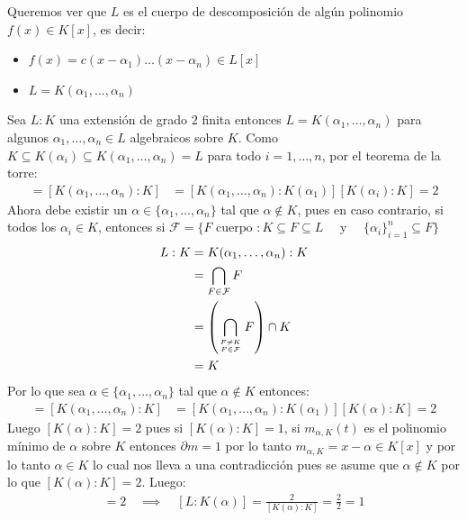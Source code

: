 \begin{solucion}
Queremos ver que $L$ es el cuerpo de descomposición de algún polinomio $f(x) \in K[x]$, es decir:
\begin{itemize}
    \item $f(x) = c(x-\alpha_1)\dots(x-\alpha_n) \in L[x]$ 
    \item $L = K(\alpha_1,\dots,\alpha_n)$
\end{itemize}
Sea $L:K$ una extensión de grado $2$ finita entonces $L = K(\alpha_1, \dots, \alpha_n)$ para algunos $\alpha_1, \dots, \alpha_n \in L$ algebraicos sobre $K$. Como $K\subseteq K(\alpha_i)\subseteq K(\alpha_1,\dots,\alpha_n) = L$ para todo $i =1,\dots,n$, por el teorema de la torre:
\begin{align*}
[L:K]= [K(\alpha_1,\dots,\alpha_n):K] &= [K(\alpha_1,\dots,\alpha_n):K(\alpha_1)][K(\alpha_i):K]=2
\end{align*}
Ahora debe existir un $\alpha \in \{\alpha_1, \dots, \alpha_n\}$ tal que $\alpha \notin K$, pues en caso contrario, si todos los $\alpha_i \in K$, entonces si $\mathcal F = \{F \text{ cuerpo }: K \subseteq F \subseteq L\quad \text{   y   } \quad \{\alpha_i\}_{i=1}^n \subseteq F\}$
\begin{align*}
    L:K &= K(\alpha_1, \dots, \alpha_n):K \\
    &=\bigcap_{F\in \mathcal F} F\\
    &= \left(\bigcap_{F\neq K \atop F\in \mathcal F } F \right) \cap K\\
    &= K
\end{align*}
Por lo que sea $\alpha \in \{\alpha_1, \dots,\alpha_n\}$ tal que $\alpha \notin K$ entonces:
\begin{align*}
[L:K]= [K(\alpha_1,\dots,\alpha_n):K] &= [K(\alpha_1,\dots,\alpha_n):K(\alpha_1)][K(\alpha):K]=2
\end{align*}
Luego $[K(\alpha):K]=2$ pues si $[K(\alpha):K] =1$, si $m_{\alpha, K}(t)$ es el polinomio mínimo de $\alpha$ sobre $K$ entonces $\partial m = 1$ por lo tanto $m_{\alpha, K} = x - \alpha \in K[x]$ y por lo tanto $\alpha \in K$ lo cual nos lleva a una contradicción pues se asume que $\alpha \notin K$ por lo que $[K(\alpha):K] = 2$. Luego:
\begin{align*}
    [L:K(\alpha)][K(\alpha):K]=2 \quad \implies \quad [L:K(\alpha)] =  \frac{2}{[K(\alpha):K]} = \frac{2}{2} = 1
\end{align*}



\end{solucion}
